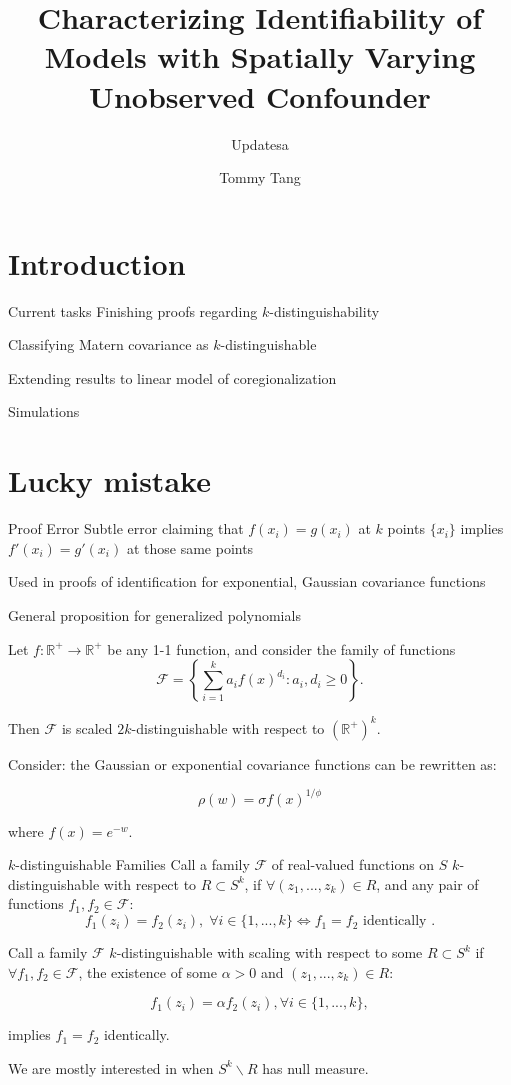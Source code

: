 \documentclass[10 pt]{beamer}
\title[]{Characterizing Identifiability of Models with Spatially Varying Unobserved Confounder}
\subtitle{\vspace{2mm} Updatesa
}
\author{Tommy Tang}
\institute[UIUC] %
{
  University of Illinois, Urbana Champaign
}
\date{}
\newcommand{\R}{{\mathbb R}}
\begin{document}
\frame{\titlepage}
\section{Introduction}

\begin{frame}{Current tasks}
Finishing proofs regarding $k$-distinguishability\bigskip

Classifying Matern covariance as $k$-distinguishable 
\bigskip

Extending results to linear model of coregionalization
\bigskip

Simulations
\end{frame}
\section{Lucky mistake}
\begin{frame}{Proof Error}
Subtle error claiming that $f(x_i) = g(x_i)$ at $k$ points $\{x_i\}$ implies $f'(x_i)=g'(x_i)$ at those same points \bigskip

Used in proofs of identification for exponential, Gaussian covariance functions
\end{frame}


\begin{frame}{General proposition for generalized polynomials}

Let $f:\R^+\to \R^+$ be any 1-1 function, and consider the family of functions
\[\mathcal{F} = \left\{\sum_{i=1}^k a_i f(x)^{d_i} : a_i, d_i \ge 0 \right\}.\]

Then $\mathcal{F}$ is scaled $2k$-distinguishable with respect to $(\R^+)^k$.\bigskip

Consider: the Gaussian or exponential covariance functions can be rewritten as:

\[\rho(w) = \sigma f(x)^{1/\phi}\] 

where $f(x) = e^{-w}$.

\end{frame}

\begin{frame}{$k$-distinguishable Families}
Call a family $\mathcal{F}$ of real-valued functions on $S$ $k$-distinguishable with respect to $R\subset S^{k}$, if $\forall (z_1,...,z_k) \in R$, and any pair of functions $f_1, f_2 \in \mathcal{F}$:
\[f_1(z_i) = f_2(z_i), \; \forall i\in\{1,...,k\} \iff f_1 = f_2 \text{ identically }.\]

Call a family $\mathcal{F}$ $k$-distinguishable with scaling with respect to some $R \subset S^k$ if  $\forall f_1, f_2 \in \mathcal{F}$, the existence of some $\alpha > 0$ and $(z_1,...,z_k)\in R$:

\[f_1(z_i) = \alpha f_2(z_i), \forall i\in \{1,...,k\}, \]

implies $f_1=f_2$ identically.

We are mostly interested in when $S^k \backslash R$ has null measure.

\end{frame}
\end{document}
